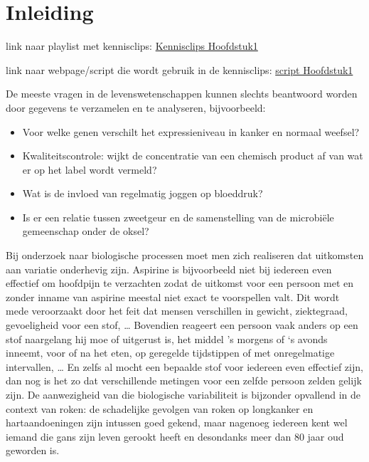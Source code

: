\documentclass[
  dutch,
  letterpaper,
  12pt]{book}
\providecommand{\tightlist}{%
  \setlength{\itemsep}{0pt}\setlength{\parskip}{0pt}}
\theoremstyle{definition}
\theoremstyle{definition}
\theoremstyle{definition}
\theoremstyle{remark}
\begin{document}

\chapter{Inleiding}\label{inleiding}

link naar playlist met kennisclips:
\href{https://www.youtube.com/playlist?list=PLZH1hP8_LbJIk4G2AZYYKvgZLjRR-1-Iw}{Kennisclips
Hoofdstuk1}

link naar webpage/script die wordt gebruik in de kennisclips:
\href{https://statomics.github.io/sbc/rmd/01-intro.html}{script
Hoofdstuk1}

De meeste vragen in de levenswetenschappen kunnen slechts beantwoord
worden door gegevens te verzamelen en te analyseren, bijvoorbeeld:

\begin{itemize}
\tightlist
\item
  Voor welke genen verschilt het expressieniveau in kanker en normaal
  weefsel?
\item
  Kwaliteitscontrole: wijkt de concentratie van een chemisch product af
  van wat er op het label wordt vermeld?\\
\item
  Wat is de invloed van regelmatig joggen op bloeddruk?
\item
  Is er een relatie tussen zweetgeur en de samenstelling van de
  microbiële gemeenschap onder de oksel?
\end{itemize}

Bij onderzoek naar biologische processen moet men zich realiseren dat
uitkomsten aan variatie onderhevig zijn. Aspirine is bijvoorbeeld niet
bij iedereen even effectief om hoofdpijn te verzachten zodat de uitkomst
voor een persoon met en zonder inname van aspirine meestal niet exact te
voorspellen valt. Dit wordt mede veroorzaakt door het feit dat mensen
verschillen in gewicht, ziektegraad, gevoeligheid voor een stof,
\ldots{} Bovendien reageert een persoon vaak anders op een stof
naargelang hij moe of uitgerust is, het middel 's morgens of `s avonds
inneemt, voor of na het eten, op geregelde tijdstippen of met
onregelmatige intervallen, \ldots{} En zelfs al mocht een bepaalde stof
voor iedereen even effectief zijn, dan nog is het zo dat verschillende
metingen voor een zelfde persoon zelden gelijk zijn. De aanwezigheid van
die biologische variabiliteit is bijzonder opvallend in de context van
roken: de schadelijke gevolgen van roken op longkanker en
hartaandoeningen zijn intussen goed gekend, maar nagenoeg iedereen kent
wel iemand die gans zijn leven gerookt heeft en desondanks meer dan 80
jaar oud geworden is.
\end{document}
